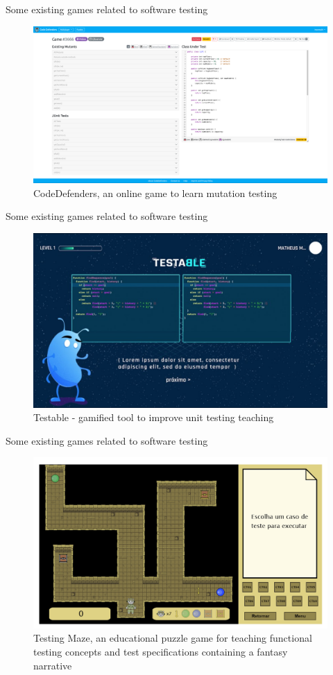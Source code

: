 \documentclass[aspectratio=169]{beamer}
\begin{document}
\begin{frame}{Some existing games related to software testing}
\begin{figure}
    \centering
    \includegraphics[width=0.75\linewidth]{images//games/codedefenders.png}
    \caption{CodeDefenders, an online game to learn mutation testing}
\end{figure}
\end{frame}

\begin{frame}{Some existing games related to software testing}
\begin{figure}
    \centering
    \includegraphics[width=0.75\linewidth]{images//games/testable}
    \caption{Testable - gamified tool to improve unit testing teaching}
\end{figure}
\end{frame}

\begin{frame}{Some existing games related to software testing}
\begin{figure}
    \centering
    \includegraphics[width=0.75\linewidth]{images//games/testingmaze}
    \caption{Testing Maze, an educational puzzle game for teaching functional testing concepts and test specifications containing a fantasy narrative}
\end{figure}
\end{frame}
\end{document}
